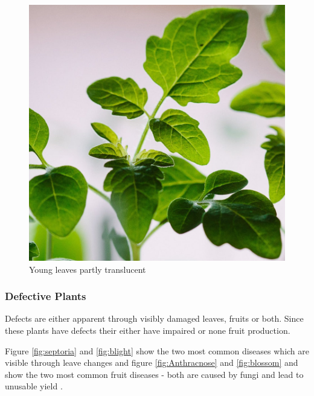 \begin{figure}[H]
\begin{minipage}[b]{0.49\textwidth}
        \includegraphics[width=\textwidth]{user-view/plant2_Francesco_Gallarotti_unsplash.jpg}
        \caption{Young leaves partly translucent}
    \end{minipage}
\end{figure}
\newpage
\subsubsection*{Defective Plants}

Defects are either apparent through visibly damaged leaves, fruits or both.
Since these plants have defects their either have impaired or none fruit production.

Figure \ref{fig:septoria} and \ref{fig:blight} show the two most common diseases which are visible through leave changes and
figure \ref{fig:Anthracnose} and \ref{fig:blossom} and show the two most common fruit diseases - both are caused by fungi
and lead to unusable yield \cite{diseases}.

